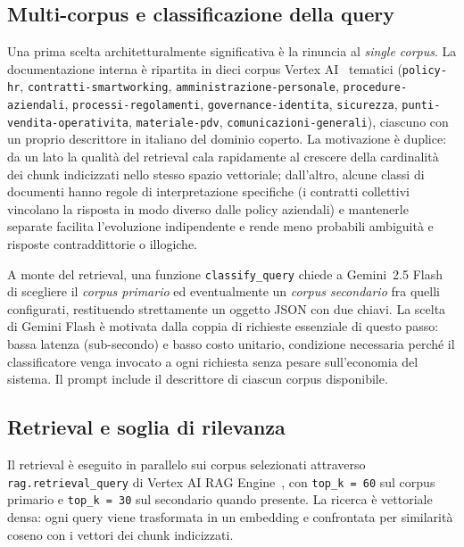 \subsection{Multi-corpus e classificazione della query}
\label{subsec:coopolicy-multicorpus}

Una prima scelta architetturalmente significativa è la rinuncia al
\emph{single corpus}. La documentazione interna è ripartita in dieci corpus
Vertex AI~\cite{gcp_vertex_rag} tematici (\texttt{policy-hr},
\texttt{contratti-smartworking}, \texttt{amministrazione-personale},
\texttt{procedure-aziendali}, \texttt{processi-regolamenti},
\texttt{governance-identita}, \texttt{sicurezza},
\texttt{punti-vendita-operativita}, \texttt{materiale-pdv},
\texttt{comunicazioni-generali}), ciascuno con un proprio descrittore in
italiano del dominio coperto. La motivazione è duplice: da un lato la
qualità del retrieval cala rapidamente al crescere della cardinalità dei
chunk indicizzati nello stesso spazio vettoriale; dall'altro, alcune
classi di documenti hanno regole di interpretazione
specifiche (i contratti collettivi vincolano la risposta in modo diverso
dalle policy aziendali) e mantenerle separate facilita l'evoluzione
indipendente e rende meno probabili ambiguità e risposte contraddittorie
o illogiche.

A monte del retrieval, una funzione \texttt{classify\_query} chiede a
Gemini~2.5 Flash di scegliere il \emph{corpus primario} ed eventualmente
un \emph{corpus secondario} fra quelli configurati, restituendo
strettamente un oggetto JSON con due chiavi. La scelta di Gemini Flash è
motivata dalla coppia di richieste essenziale di questo passo: bassa
latenza (sub-secondo) e basso costo unitario, condizione necessaria
perché il classificatore venga invocato a ogni richiesta senza pesare
sull'economia del sistema. Il prompt include il descrittore di ciascun
corpus disponibile.

\subsection{Retrieval e soglia di rilevanza}
\label{subsec:coopolicy-retrieval}

Il retrieval è eseguito in parallelo sui corpus selezionati attraverso
\texttt{rag.retrieval\_query} di Vertex AI RAG Engine~\cite{gcp_vertex_rag},
con \texttt{top\_k = 60} sul corpus primario e \texttt{top\_k = 30} sul
secondario quando presente. La ricerca è vettoriale densa: ogni query
viene trasformata in un embedding e confrontata per similarità coseno
con i vettori dei chunk indicizzati.


